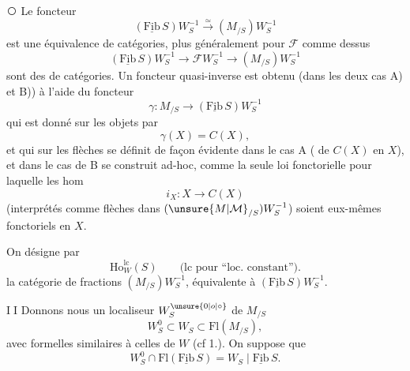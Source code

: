 \textcircled{}  Le foncteur
\[
(\underline{\mathrm{Fib}}\,S)W_S^{-1}\xrightarrow{\simeq}(M_{/S})W_S^{-1}\tag*{$(*)$}
\]
 est une équivalence de catégories, plus généralement pour  $\mathcal F$ comme dessus
\[
(\underline{\mathrm{Fib}}\,S)W_S^{-1}\longrightarrow\mathcal F W_S^{-1}\longrightarrow(M_{/S})W_S^{-1}
\]
sont des  de catégories. Un foncteur quasi-inverse est obtenu (dans les deux cas A) et B)) à l'aide du foncteur
\[
\gamma:M_{/S}\longrightarrow(\underline{\mathrm{Fib}}\,S)W_S^{-1}
\]
qui est donné sur les objets par
\[
\gamma(X)=C(X),
\]
et qui sur les flèches se définit de façon évidente dans le cas A ( de $C(X)$ en $X$), et dans le cas de B se construit ad-hoc, comme la seule loi fonctorielle pour laquelle les hom
\[
i_X:X\longrightarrow C(X)
\]
(interprétés comme flèches dans $(\unsure{M|\mathcal M}_{/S})W_S^{-1}$) soient eux-mêmes fonctoriels en $X$.

On désigne par
\[
\mathrm{Ho}_W^{\mathrm{lc}}(S)\qquad\text{(lc pour ``loc. constant'').}
\]
la catégorie de fractions $(M_{/S})W_S^{-1}$, équivalente à $(\underline{\mathrm{Fib}}\,S)W_S^{-1}$.

\textcircled{II} Donnons nous un localiseur $W_S^{\unsure{0|o|\circ}}$ de $M_{/S}$
\[
W_S^0\subset W_S\subset\mathrm{Fl}(M_{/S}),
\]
avec  formelles similaires à celles de $W$ (cf 1.). On suppose que
\[
W_S^0\cap\mathrm{Fl}(\underline{\mathrm{Fib}}\,S)=W_S\mid\underline{\mathrm{Fib}}\,S.\tag*{3°)}
\]

